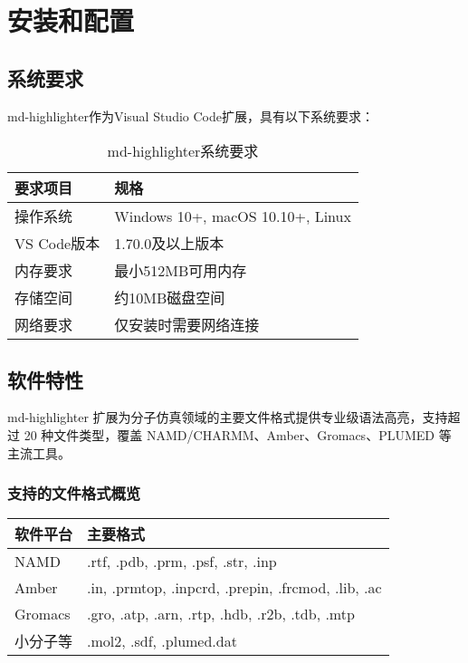 
\section{安装和配置}

\subsection{系统要求}

md-highlighter作为Visual Studio Code扩展，具有以下系统要求：

\begin{table}[h]
\centering
\caption{md-highlighter系统要求}
\begin{tabular}{p{3cm}p{8cm}}
\toprule
\textbf{要求项目} & \textbf{规格} \\
\midrule
操作系统 & Windows 10+, macOS 10.10+, Linux \\
VS Code版本 & 1.70.0及以上版本 \\
内存要求 & 最小512MB可用内存 \\
存储空间 & 约10MB磁盘空间 \\
网络要求 & 仅安装时需要网络连接 \\
\bottomrule
\end{tabular}
\end{table}

\subsection{软件特性}

md-highlighter 扩展为分子仿真领域的主要文件格式提供专业级语法高亮，支持超过 20 种文件类型，覆盖 NAMD/CHARMM、Amber、Gromacs、PLUMED 等主流工具。

\subsubsection{支持的文件格式概览}
\begin{table}[h]
\centering
\caption{支持的文件格式概览}
\label{tab:file_format}
\begin{longtable}{p{3cm}p{11cm}}
\toprule
\textbf{软件平台} & \textbf{主要格式} \\
\midrule
NAMD & .rtf, .pdb, .prm, .psf, .str, .inp \\
Amber & .in, .prmtop, .inpcrd, .prepin, .frcmod, .lib, .ac \\
Gromacs & .gro, .atp, .arn, .rtp, .hdb, .r2b, .tdb, .mtp \\
小分子等 & .mol2, .sdf, .plumed.dat \\
\bottomrule
\end{longtable}
\end{table}

